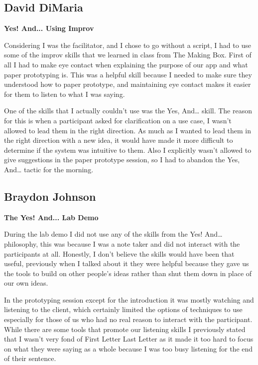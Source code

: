 \documentclass[12pt,letterpaper]{article}
\begin{document}
\subsection{David DiMaria}
\textbf{Yes! And... Using Improv}\par
Considering I was the facilitator, and I chose to go without a script, I had to use some of the improv skills that we learned in class from The Making Box. First of all I had to make eye contact when explaining the purpose of our app and what paper prototyping is. This was a helpful skill because I needed to make sure they understood how to paper prototype, and maintaining eye contact makes it easier for them to listen to what I was saying.\par
One of the skills that I actually couldn’t use was the Yes, And… skill. The reason for this is when a participant asked for clarification on a use case, I wasn’t allowed to lead them in the right direction. As much as I wanted to lead them in the right direction with a new idea, it would have made it more difficult to determine if the system was intuitive to them. Also I explicitly wasn’t allowed to give suggestions in the paper prototype session, so I had to abandon the Yes, And… tactic for the morning. 


\clearpage
\subsection{Braydon Johnson}
\textbf{The Yes! And... Lab Demo}\par
During the lab demo I did not use any of the skills from the Yes! And… philosophy, this was because I was a note taker and did not interact with the participants at all. Honestly, I don’t believe the skills would have been that useful, previously when I talked about it they were helpful because they gave us the tools to build on other people’s ideas rather than shut them down in place of our own ideas.\par 
In the prototyping session except for the introduction it was mostly watching and listening to the client, which certainly limited the options of techniques to use especially for those of us who had no real reason to interact with the participant. While there are some tools that promote our listening skills I previously stated that I wasn’t very fond of First Letter Last Letter as it made it too hard to focus on what they were saying as a whole because I was too busy listening for the end of their sentence.


\clearpage
\end{document}
